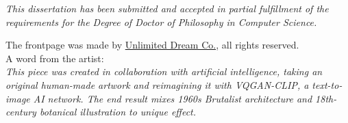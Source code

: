 
\vspace*{\fill}
\vspace*{\fill}
\vspace*{\fill}
\begin{center}
\textit{
This dissertation has been submitted and accepted in partial fulfillment of
the requirements for the Degree of Doctor of Philosophy in
Computer Science.
}
\end{center}

\vspace*{\fill}
\vspace*{\fill}
\vspace*{\fill}
\newpage


\vspace*{\fill}
\begin{center}

The frontpage was made by \href{https://www.unlimiteddreamco.xyz/}{Unlimited Dream Co.}, all rights reserved.\\
A word from the artist: \\
\textit{This piece was created in collaboration with artificial intelligence, taking an original human-made artwork and reimagining it with VQGAN-CLIP, a text-to-image AI network. The end result mixes 1960s Brutalist architecture and 18th-century botanical illustration to unique effect.}

\end{center}
\vspace*{\fill}
\vspace*{\fill}
\vspace*{\fill}
